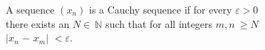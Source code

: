 \documentclass[preview]{standalone}
\begin{document}
\begin{center}
A sequence $(x_n)$ is a Cauchy sequence if for every $\varepsilon > 0$\\there exists an $N$$\in\:$$\mathbb{N}$ such that for all integers $m, n\:$$ \geq$$N$\\$|$$x_n$ $-$ $x_m$$|$ $<\varepsilon$.
\end{center}
\end{document}
